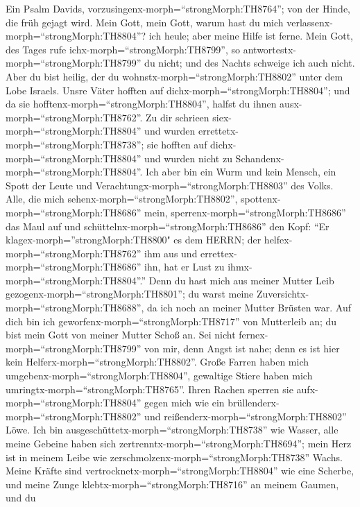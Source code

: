  Ein Psalm Davids,
vorzusingenx-morph=``strongMorph:TH8764''; von der Hinde, die früh
gejagt wird. Mein Gott, mein Gott, warum hast du mich
verlassenx-morph=``strongMorph:TH8804''? ich heule; aber meine Hilfe ist
ferne.  Mein Gott, des Tages rufe
ichx-morph=``strongMorph:TH8799'', so
antwortestx-morph=``strongMorph:TH8799'' du nicht; und des Nachts
schweige ich auch nicht.  Aber du bist heilig, der du
wohnstx-morph=``strongMorph:TH8802'' unter dem Lobe Israels.
 Unsre Väter hofften auf dichx-morph=``strongMorph:TH8804'';
und da sie hofftenx-morph=``strongMorph:TH8804'', halfst du ihnen
ausx-morph=``strongMorph:TH8762''.  Zu dir schrieen
siex-morph=``strongMorph:TH8804'' und wurden
errettetx-morph=``strongMorph:TH8738''; sie hofften auf
dichx-morph=``strongMorph:TH8804'' und wurden nicht zu
Schandenx-morph=``strongMorph:TH8804''.  Ich aber bin ein
Wurm und kein Mensch, ein Spott der Leute und
Verachtungx-morph=``strongMorph:TH8803'' des Volks.  Alle,
die mich sehenx-morph=``strongMorph:TH8802'',
spottenx-morph=``strongMorph:TH8686'' mein,
sperrenx-morph=``strongMorph:TH8686'' das Maul auf und
schüttelnx-morph=``strongMorph:TH8686'' den Kopf:  ``Er
klagex-morph=''strongMorph:TH8800" es dem HERRN; der
helfex-morph=``strongMorph:TH8762'' ihm aus und
errettex-morph=``strongMorph:TH8686'' ihn, hat er Lust zu
ihmx-morph=``strongMorph:TH8804''.''  Denn du hast mich aus
meiner Mutter Leib gezogenx-morph=``strongMorph:TH8801''; du warst meine
Zuversichtx-morph=``strongMorph:TH8688'', da ich noch an meiner Mutter
Brüsten war.  Auf dich bin ich
geworfenx-morph=``strongMorph:TH8717'' von Mutterleib an; du bist mein
Gott von meiner Mutter Schoß an.  Sei nicht
fernex-morph=``strongMorph:TH8799'' von mir, denn Angst ist nahe; denn
es ist hier kein Helferx-morph=``strongMorph:TH8802''. 
Große Farren haben mich umgebenx-morph=``strongMorph:TH8804'', gewaltige
Stiere haben mich umringtx-morph=``strongMorph:TH8765''. 
Ihren Rachen sperren sie aufx-morph=``strongMorph:TH8804'' gegen mich
wie ein brüllenderx-morph=``strongMorph:TH8802'' und
reißenderx-morph=``strongMorph:TH8802'' Löwe.  Ich bin
ausgeschüttetx-morph=``strongMorph:TH8738'' wie Wasser, alle meine
Gebeine haben sich zertrenntx-morph=``strongMorph:TH8694''; mein Herz
ist in meinem Leibe wie zerschmolzenx-morph=``strongMorph:TH8738''
Wachs.  Meine Kräfte sind
vertrocknetx-morph=``strongMorph:TH8804'' wie eine Scherbe, und meine
Zunge klebtx-morph=``strongMorph:TH8716'' an meinem Gaumen, und du
